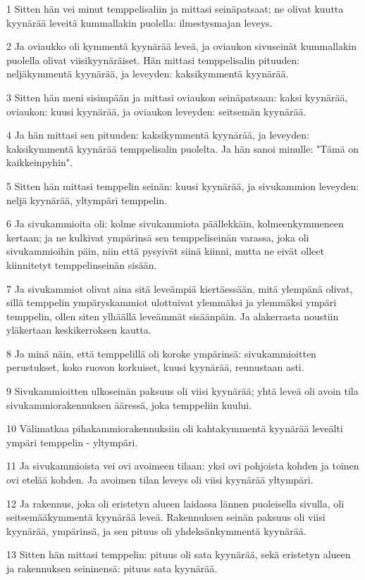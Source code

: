 \par 1 Sitten hän vei minut temppelisaliin ja mittasi seinäpatsaat; ne olivat kuutta kyynärää leveitä kummallakin puolella: ilmestysmajan leveys.
\par 2 Ja oviaukko oli kymmentä kyynärää leveä, ja oviaukon sivuseinät kummallakin puolella olivat viisikyynäräiset. Hän mittasi temppelisalin pituuden: neljäkymmentä kyynärää, ja leveyden: kaksikymmentä kyynärää.
\par 3 Sitten hän meni sisimpään ja mittasi oviaukon seinäpatsaan: kaksi kyynärää, oviaukon: kuusi kyynärää, ja oviaukon leveyden: seitsemän kyynärää.
\par 4 Ja hän mittasi sen pituuden: kaksikymmentä kyynärää, ja leveyden: kaksikymmentä kyynärää temppelisalin puolelta. Ja hän sanoi minulle: "Tämä on kaikkeinpyhin".
\par 5 Sitten hän mittasi temppelin seinän: kuusi kyynärää, ja sivukammion leveyden: neljä kyynärää, yltympäri temppelin.
\par 6 Ja sivukammioita oli: kolme sivukammiota päällekkäin, kolmeenkymmeneen kertaan; ja ne kulkivat ympärinsä sen temppeliseinän varassa, joka oli sivukammioihin päin, niin että pysyivät siinä kiinni, mutta ne eivät olleet kiinnitetyt temppelinseinän sisään.
\par 7 Ja sivukammiot olivat aina sitä leveämpiä kiertäessään, mitä ylempänä olivat, sillä temppelin ympäryskammiot ulottuivat ylemmäksi ja ylemmäksi ympäri temppelin, ollen siten ylhäällä leveämmät sisäänpäin. Ja alakerrasta noustiin yläkertaan keskikerroksen kautta.
\par 8 Ja minä näin, että temppelillä oli koroke ympärinsä: sivukammioitten perustukset, koko ruovon korkuiset, kuusi kyynärää, reunustaan asti.
\par 9 Sivukammioitten ulkoseinän paksuus oli viisi kyynärää; yhtä leveä oli avoin tila sivukammiorakennuksen ääressä, joka temppeliin kuului.
\par 10 Välimatkaa pihakammiorakennuksiin oli kahtakymmentä kyynärää leveälti ympäri temppelin - yltympäri.
\par 11 Ja sivukammioista vei ovi avoimeen tilaan: yksi ovi pohjoista kohden ja toinen ovi etelää kohden. Ja avoimen tilan leveys oli viisi kyynärää yltympäri.
\par 12 Ja rakennus, joka oli eristetyn alueen laidassa lännen puoleisella sivulla, oli seitsemääkymmentä kyynärää leveä. Rakennuksen seinän paksuus oli viisi kyynärää, ympärinsä, ja sen pituus oli yhdeksänkymmentä kyynärää.
\par 13 Sitten hän mittasi temppelin: pituus oli sata kyynärää, sekä eristetyn alueen ja rakennuksen seininensä: pituus sata kyynärää.
